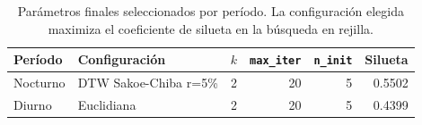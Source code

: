 
\begin{table}[ht]
  \centering
  \caption{Parámetros finales seleccionados por período. La configuración elegida maximiza el coeficiente de silueta en la búsqueda en rejilla.}
  \label{tab:tuning_final}
  \begin{tabular}{llrrrr}
    \toprule
    \textbf{Período} & \textbf{Configuración} & \textbf{$k$} & \textbf{\texttt{max\_iter}} & \textbf{\texttt{n\_init}} & \textbf{Silueta} \\
    \midrule
    Nocturno & DTW Sakoe-Chiba r=5\% & 2 & 20 & 5 & 0.5502 \\
    Diurno & Euclidiana & 2 & 20 & 5 & 0.4399 \\
    \bottomrule
  \end{tabular}
\end{table}

